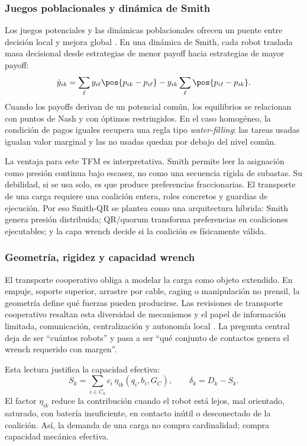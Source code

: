 \subsubsection{Juegos poblacionales y dinámica de Smith}

Los juegos potenciales y las dinámicas poblacionales ofrecen un puente entre decisión
local y mejora global \citep{monderer1996potential,sandholm2010population,
quijano2017population,barreiro2017distributed}. En una dinámica de Smith, cada robot
traslada masa decisional desde estrategias de menor payoff hacia estrategias de mayor
payoff:
\[
  \dot y_{ik} =
  \sum_{\ell} y_{i\ell}\pos{p_{ik}-p_{i\ell}}
  - y_{ik}\sum_{\ell}\pos{p_{i\ell}-p_{ik}} .
\]
Cuando los payoffs derivan de un potencial común, los equilibrios se relacionan con
puntos de Nash y con óptimos restringidos. En el caso homogéneo, la condición de pagos
iguales recupera una regla tipo \emph{water-filling}: las tareas usadas igualan valor
marginal y las no usadas quedan por debajo del nivel común.

La ventaja para este TFM es interpretativa. Smith permite leer la asignación como presión
continua bajo escasez, no como una secuencia rígida de subastas. Su debilidad, si se usa
solo, es que produce preferencias fraccionarias. El transporte de una carga requiere una
coalición entera, roles concretos y guardias de ejecución. Por eso Smith-QR se plantea
como una arquitectura híbrida: Smith genera presión distribuida; QR/quorum transforma
preferencias en coaliciones ejecutables; y la capa wrench decide si la coalición es
físicamente válida.

\subsubsection{Geometría, rigidez y capacidad wrench}

El transporte cooperativo obliga a modelar la carga como objeto extendido. En empuje,
soporte superior, arrastre por cable, caging o manipulación no prensil, la geometría
define qué fuerzas pueden producirse. Las revisiones de transporte cooperativo resaltan
esta diversidad de mecanismos y el papel de información limitada, comunicación,
centralización y autonomía local \citep{tuci2018cooperative,farivarnejad2022multirobot}.
La pregunta central deja de ser ``cuántos robots'' y pasa a ser ``qué conjunto de contactos
genera el wrench requerido con margen''.

Esta lectura justifica la capacidad efectiva:
\[
  S_k = \sum_{i\in C_k} c_i\,\eta_{ik}(q_i,b_i,G_C),
  \qquad
  \delta_k = D_k - S_k .
\]
El factor $\eta_{ik}$ reduce la contribución cuando el robot está lejos, mal orientado,
saturado, con batería insuficiente, en contacto inútil o desconectado de la coalición.
Así, la demanda de una carga no compra cardinalidad; compra capacidad mecánica efectiva.


